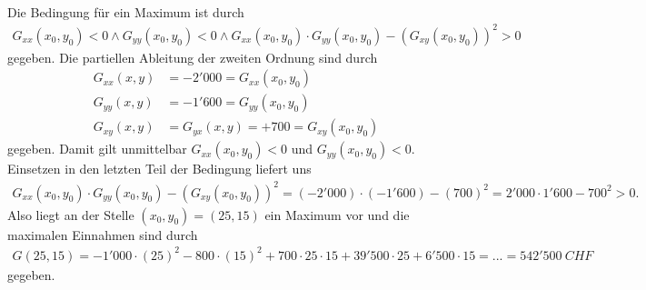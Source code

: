 \\
Die Bedingung für ein Maximum ist durch
\begin{align*}
G_{xx}(x_0,y_0) < 0 \wedge G_{yy}(x_0,y_0) < 0 \wedge
G_{xx}(x_0,y_0) \cdot G_{yy}(x_0,y_0) - (G_{xy}(x_0,y_0))^2 > 0
\end{align*}
gegeben. Die partiellen Ableitung der zweiten Ordnung sind durch 
\begin{align*}
G_{xx}(x,y) &= -2'000 = G_{xx}(x_0,y_0)\\
G_{yy}(x,y) &= -1'600 = G_{yy}(x_0,y_0)\\
G_{xy}(x,y) &= G_{yx}(x,y) = + 700 =  G_{xy}(x_0,y_0)  
\end{align*}
gegeben. Damit gilt unmittelbar $ G_{xx}(x_0,y_0) < 0 $ und $ G_{yy}(x_0,y_0) <0 $.
Einsetzen in den letzten Teil der Bedingung liefert uns 
\begin{align*}
G_{xx}(x_0,y_0) \cdot G_{yy}(x_0,y_0) - (G_{xy}(x_0,y_0))^2
=
(-2'000) \cdot (- 1'600) - (700)^2
=
2'000 \cdot 1'600 - 700^2  > 0. 
\end{align*}
Also liegt an der Stelle $ (x_0,y_0 ) = (25,15) $ ein Maximum vor und die maximalen Einnahmen sind durch 
\begin{align*}
G(25,15) = - 1'000\cdot (25)^2 - 800 \cdot  (15)^2 + 700 \cdot 25 \cdot 15 + 39'500\cdot 25 + 6'500 \cdot 15=
... 
=
542'500 \ CHF
\end{align*}
gegeben.
\newpage

